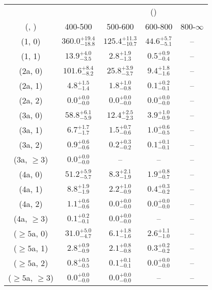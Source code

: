 \begin{table}[h!]
\tiny
\centering
{}
\begin{tabular}
{ccccc}
	\hline\hline
&	& \multicolumn{4}{c}{\scalht (\gev)} \\ 
	 (\njet,  \nb) & 400-500 & 500-600 & 600-800 & 800-$\infty$ \\ [0.8ex] 
\hline
	(1, 0) & $360.0^{+ 19.4 }_{- 18.8 }$ & $125.4^{+ 11.3 }_{- 10.7 }$ & $44.6^{+ 5.7 }_{- 5.1 }$ & -- \\[0.5ex] 
	(1, 1) & $13.9^{+ 4.0 }_{- 3.5 }$ & $2.8^{+ 1.9 }_{- 1.3 }$ & $0.5^{+ 0.9 }_{- 0.4 }$ & -- \\[0.5ex] 
	(2a, 0) & $101.6^{+ 8.4 }_{- 8.2 }$ & $25.8^{+ 3.9 }_{- 3.7 }$ & $9.4^{+ 1.8 }_{- 1.6 }$ & -- \\[0.5ex] 
	(2a, 1) & $4.8^{+ 1.5 }_{- 1.4 }$ & $1.8^{+ 1.0 }_{- 0.8 }$ & $0.1^{+ 0.2 }_{- 0.1 }$ & -- \\[0.5ex] 
	(2a, 2) & $0.0^{+ 0.0 }_{- 0.0 }$ & $0.0^{+ 0.0 }_{- 0.0 }$ & $0.0^{+ 0.0 }_{- 0.0 }$ & -- \\[0.5ex] 
	(3a, 0) & $58.8^{+ 6.1 }_{- 5.9 }$ & $12.4^{+ 2.5 }_{- 2.3 }$ & $3.9^{+ 1.0 }_{- 0.9 }$ & -- \\[0.5ex] 
	(3a, 1) & $6.7^{+ 1.7 }_{- 1.7 }$ & $1.5^{+ 0.7 }_{- 0.6 }$ & $1.0^{+ 0.6 }_{- 0.5 }$ & -- \\[0.5ex] 
	(3a, 2) & $0.9^{+ 0.6 }_{- 0.6 }$ & $0.2^{+ 0.3 }_{- 0.2 }$ & $0.1^{+ 0.1 }_{- 0.1 }$ & -- \\[0.5ex] 
	(3a, $\ge3$) & $0.0^{+ 0.0 }_{- 0.0 }$ & -- & -- & -- \\[0.5ex] 
	(4a, 0) & $51.2^{+ 5.9 }_{- 5.7 }$ & $8.3^{+ 2.1 }_{- 1.9 }$ & $1.9^{+ 0.8 }_{- 0.7 }$ & -- \\[0.5ex] 
	(4a, 1) & $8.8^{+ 1.9 }_{- 1.9 }$ & $2.2^{+ 1.0 }_{- 0.9 }$ & $0.4^{+ 0.3 }_{- 0.2 }$ & -- \\[0.5ex] 
	(4a, 2) & $1.1^{+ 0.6 }_{- 0.6 }$ & $0.0^{+ 0.0 }_{- 0.0 }$ & $0.0^{+ 0.0 }_{- 0.0 }$ & -- \\[0.5ex] 
	(4a, $\ge3$) & $0.1^{+ 0.2 }_{- 0.1 }$ & $0.0^{+ 0.0 }_{- 0.0 }$ & -- & -- \\[0.5ex] 
	($\ge5$a, 0) & $31.0^{+ 5.0 }_{- 4.7 }$ & $6.1^{+ 1.8 }_{- 1.6 }$ & $2.6^{+ 1.1 }_{- 1.0 }$ & -- \\[0.5ex] 
	($\ge5$a, 1) & $2.8^{+ 0.9 }_{- 0.9 }$ & $2.1^{+ 0.8 }_{- 0.8 }$ & $0.3^{+ 0.2 }_{- 0.2 }$ & -- \\[0.5ex] 
	($\ge5$a, 2) & $0.8^{+ 0.5 }_{- 0.5 }$ & $0.1^{+ 0.1 }_{- 0.1 }$ & $0.0^{+ 0.0 }_{- 0.0 }$ & -- \\[0.5ex] 
	($\ge5$a, $\ge3$) & $0.0^{+ 0.0 }_{- 0.0 }$ & $0.0^{+ 0.0 }_{- 0.0 }$ & -- & -- \\[0.5ex] 
	\hline
	\hline
\end{tabular}
\end{table}
